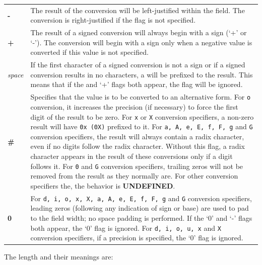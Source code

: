 \begin{longtable}{m{}m{}}
\textbf{-}&The result of the conversion will be left-justified within the field. The
conversion is right-justified if the flag is not specified.\\
\textbf{+}&The result of a signed conversion will always begin with a sign (`+'
or `-'). The conversion will begin with a sign only when a negative value is
converted if this value is not specified.\\
\textit{space}&If the first character of a signed conversion is not a sign or if a signed
conversion results in no characters, a will be prefixed to the result. This
means that if the and `+' flags both appear, the flag will be ignored.\\
\textbf{\#}& Specifies that the value is to be converted to an alternative
form. For \texttt{o} conversion, it increases the precision (if necessary) to
force the first digit of the result to be zero. For \texttt{x} or \texttt{X}
conversion specifiers, a non-zero result will have \texttt{0x (0X)} prefixed to
it. For \texttt{a, A, e, E, f, F, g} and \texttt{G} conversion specifiers, the
result will always contain a radix character, even if no digits follow the
radix character. Without this flag, a radix character appears in the result of
these conversions only if a digit follows it.
For \texttt{0} and \texttt{G} conversion specifiers, trailing zeros will not be
removed from the result as they normally are. For other conversion specifiers
the, the behavior is \textbf{UNDEFINED}.\\
\textbf{0}&For \texttt{d, i, o, x, X, a, A, e, E, f, F, g} and \texttt{G}
conversion specifiers, leading zeros (following any indication of sign or base)
are used to pad to the field width; no space padding is performed. If the `0'
and `-' flags both appear, the `0' flag is ignored. For \texttt{d, i, o, u, x}
and \texttt{X} conversion specifiers, if a precision is specified, the `0' flag
is ignored.
\end{longtable}

The length and their meanings are:

